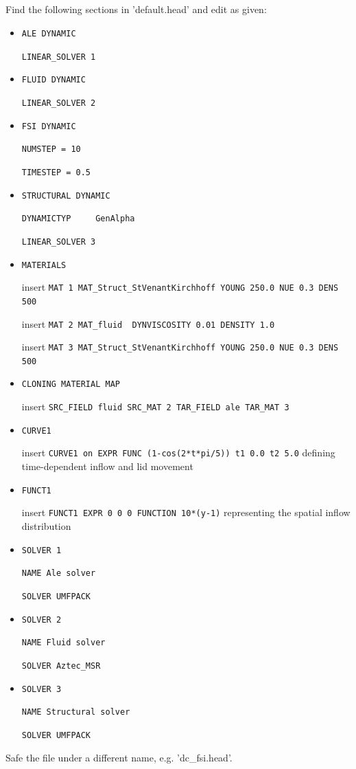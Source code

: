 \subsection{\head}
Find the following sections in 'default.head' and edit as given:
\begin{itemize}

 \item \verb|ALE DYNAMIC|

 \verb|LINEAR_SOLVER 1|

 \item \verb|FLUID DYNAMIC|

 \verb|LINEAR_SOLVER 2|

 \item \verb|FSI DYNAMIC|

 \verb|NUMSTEP = 10|

 \verb|TIMESTEP = 0.5|

 \item \verb|STRUCTURAL DYNAMIC|

 \verb|DYNAMICTYP     GenAlpha|

 \verb|LINEAR_SOLVER 3|

 \item \verb|MATERIALS|

  insert \verb|MAT 1 MAT_Struct_StVenantKirchhoff YOUNG 250.0 NUE 0.3 DENS 500|
  
  insert \verb|MAT 2 MAT_fluid  DYNVISCOSITY 0.01 DENSITY 1.0|

  insert \verb|MAT 3 MAT_Struct_StVenantKirchhoff YOUNG 250.0 NUE 0.3 DENS 500|

  \item \verb|CLONING MATERIAL MAP|

  insert \verb|SRC_FIELD fluid SRC_MAT 2 TAR_FIELD ale TAR_MAT 3|

  \item \verb|CURVE1|

  insert \verb|CURVE1 on EXPR FUNC (1-cos(2*t*pi/5)) t1 0.0 t2 5.0| defining time-dependent inflow and lid movement
 
  \item \verb|FUNCT1|

  insert \verb|FUNCT1 EXPR 0 0 0 FUNCTION 10*(y-1)| representing the spatial inflow distribution

 \item \verb|SOLVER 1|
 
 \verb|NAME Ale solver|

 \verb|SOLVER UMFPACK|

 \item \verb|SOLVER 2|
 
 \verb|NAME Fluid solver|

 \verb|SOLVER Aztec_MSR|

 \item \verb|SOLVER 3|
 
 \verb|NAME Structural solver|

 \verb|SOLVER UMFPACK|

\end{itemize}
Safe the file under a different name, e.g. 'dc\_fsi.head'.

